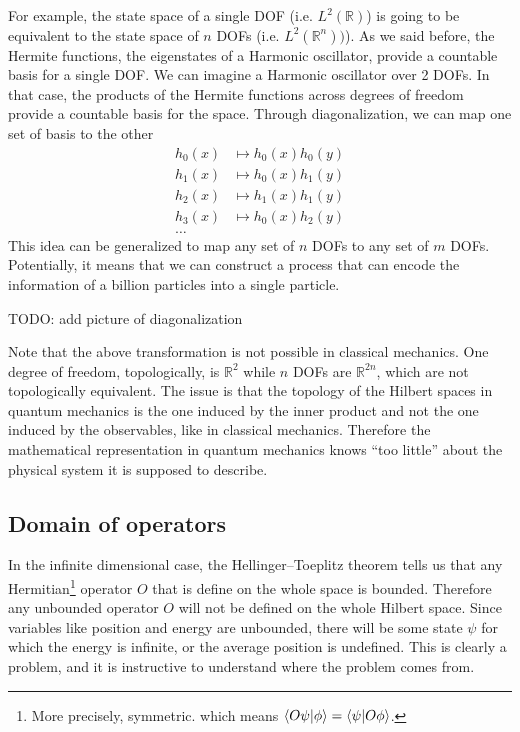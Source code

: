 For example, the state space of a single DOF (i.e. $L^2(\mathbb{R})$) is going to be equivalent to the state space of $n$ DOFs (i.e. $L^2(\mathbb{R}^n))$). As we said before, the Hermite functions, the eigenstates of a Harmonic oscillator, provide a countable basis for a single DOF. We can imagine a Harmonic oscillator over 2 DOFs. In that case, the products of the Hermite functions across degrees of freedom provide a countable basis for the space. Through diagonalization, we can map one set of basis to the other
\begin{align}
	h_0(x) &\mapsto h_0(x)h_0(y) \\
	h_1(x) &\mapsto h_0(x)h_1(y) \\
	h_2(x) &\mapsto h_1(x)h_1(y) \\
	h_3(x) &\mapsto h_0(x)h_2(y) \\
	\dots
\end{align}
This idea can be generalized to map any set of $n$ DOFs to any set of $m$ DOFs. Potentially, it means that we can construct a process that can encode the information of a billion particles into a single particle.

TODO: add picture of diagonalization


Note that the above transformation is not possible in classical mechanics. One degree of freedom, topologically, is $\mathbb{R}^2$ while $n$ DOFs are $\mathbb{R}^{2n}$, which are not topologically equivalent. The issue is that the topology of the Hilbert spaces in quantum mechanics is the one induced by the inner product and not the one induced by the observables, like in classical mechanics. Therefore the mathematical representation in quantum mechanics knows ``too little'' about the physical system it is supposed to describe.

\subsection{Domain of operators}

In the infinite dimensional case, the Hellinger–Toeplitz theorem tells us that any Hermitian\footnote{More precisely, symmetric. which means $\langle O \psi | \phi \rangle = \langle\psi | O \phi\rangle$.} operator $O$ that is define on the whole space is bounded. Therefore any unbounded operator $O$ will not be defined on the whole Hilbert space. Since variables like position and energy are unbounded, there will be some state $\psi$ for which the energy is infinite, or the average position is undefined. This is clearly a problem, and it is instructive to understand where the problem comes from.

